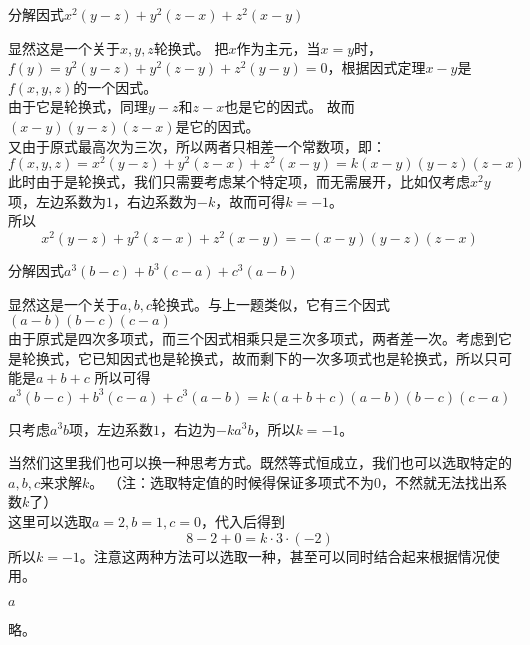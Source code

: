 \documentclass[windows,csize4]{BHCexam}
\begin{document}
\begin{groups}
\begin{questions}[]
        \question[5] 分解因式$x^2(y-z)+y^2(z-x)+z^2(x-y)$
        \begin{solution}{0.5cm}
            \methodonly 显然这是一个关于$x,y,z$轮换式。
            把$x$作为主元，当$x=y$时，$f(y)=y^2(y-z)+y^2(z-y)+z^2(y-y)=0$，根据因式定理$x-y$是$f(x,y,z)$的一个因式。 \\ 
            由于它是轮换式，同理$y-z$和$z-x$也是它的因式。 故而$(x-y)(y-z)(z-x)$是它的因式。\\ 
            又由于原式最高次为三次，所以两者只相差一个常数项，即： \\ 
            \[ 
                f(x,y,z)= x^2(y-z)+y^2(z-x)+z^2(x-y) = k(x-y)(y-z)(z-x) 
            \]
            此时由于是轮换式，我们只需要考虑某个特定项，而无需展开，比如仅考虑$x^2y$项，左边系数为$1$，右边系数为$-k$，故而可得$k=-1$。 \\ 
            所以
            \[ 
                x^2(y-z)+y^2(z-x)+z^2(x-y) = -(x-y)(y-z)(z-x) 
            \]

        \end{solution}
        \vspace{3.5cm}
        
        \question[5] 分解因式$a^3(b-c)+b^3(c-a)+c^3(a-b)$
        \begin{solution}{0.5cm}
            \methodonly 显然这是一个关于$a,b,c$轮换式。与上一题类似，它有三个因式$(a-b)(b-c)(c-a)$ \\ 
            由于原式是四次多项式，而三个因式相乘只是三次多项式，两者差一次。考虑到它是轮换式，它已知因式也是轮换式，故而剩下的一次多项式也是轮换式，所以只可能是$a+b+c$
            所以可得
            \[
                a^3(b-c)+b^3(c-a)+c^3(a-b)= k(a+b+c)(a-b)(b-c)(c-a)
            \]

            只考虑$a^3b$项，左边系数$1$，右边为$-ka^3b$，所以$k=-1$。

            当然们这里我们也可以换一种思考方式。既然等式恒成立，我们也可以选取特定的$a,b,c$来求解$k$。
            （注：选取特定值的时候得保证多项式不为0，不然就无法找出系数$k$了） \\
            这里可以选取$a=2,b=1,c=0$，代入后得到
            \[
                8-2+0=k\cdot 3  \cdot (-2) 
            \]
            所以$k=-1$。注意这两种方法可以选取一种，甚至可以同时结合起来根据情况使用。
        \end{solution}
        \vspace{3.5cm}



        \question[5] $a$
        \begin{solution}{0.5cm}
            \methodonly 略。
        \end{solution}
        \vspace{3.5cm}

    \end{questions}
\end{groups}



\label{lastpage}
\end{document}
